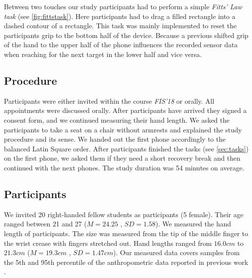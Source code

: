 Between two touches our study participants had to perform a simple \textit{Fitts' Law task} (see \cref{fig:fittstask}). 
Here participants had to drag a filled rectangle into a dashed contour of a rectangle.
This task was mainly implemented to reset the participants grip to the bottom half of the device.
Because a previous shifted grip of the hand to the upper half of the phone influences the recorded sensor data when reaching for the next target in the lower half and vice versa.
\subsection{Procedure}
Participants were either invited within the course \textit{FIS'18} or orally.
All appointments were discussed orally.
After participants have arrived they signed a consent form, and we continued measuring their hand length.
We asked the participants to take a seat on a chair without armrests and explained the study procedure and its sense.
We handed out the first phone accordingly to the balanced Latin Square order. 
After participants finished the tasks (see \cref{sec:tasks}) on the first phone, we asked them if they need a short recovery break and then continued with the next phones.
The study duration was 54 minutes on average.

\subsection{Participants}
We invited 20 right-handed fellow students as participants (5 female).
Their age ranged between 21 and 27 ($ M=24.25$ , $SD=1.58 $). 
We measured the hand length of participants. 
The size was measured from the tip of the middle finger to the wrist crease with fingers stretched out.
Hand lengths ranged from $16.0cm$ to $21.3cm$ ($M=19.3cm$ , $SD=1.47cm$).
Our measured data covers samples from the 5th and 95th percentile of the anthropometric data reported in previous work \cite{Poston}.  
